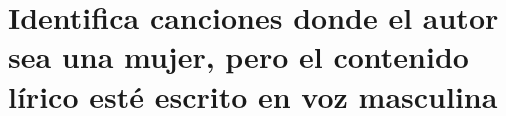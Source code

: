 \begin{itemize}
\end{itemize}

\section{Identifica canciones donde el autor sea una mujer, pero el contenido lírico esté escrito en voz masculina}
